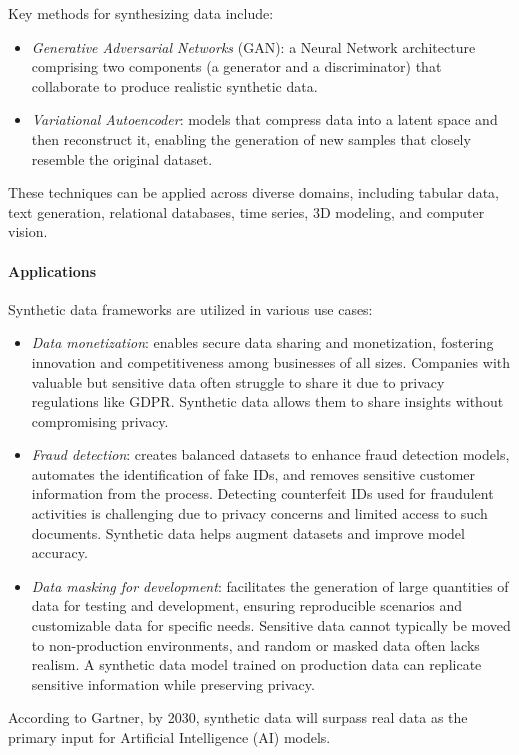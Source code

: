 Key methods for synthesizing data include:
\begin{itemize}
    \item \textit{Generative Adversarial Networks} (GAN): a Neural Network architecture comprising two components (a generator and a discriminator) that collaborate to produce realistic synthetic data.
    \item \textit{Variational Autoencoder}: models that compress data into a latent space and then reconstruct it, enabling the generation of new samples that closely resemble the original dataset.
\end{itemize}
\noindent These techniques can be applied across diverse domains, including tabular data, text generation, relational databases, time series, 3D modeling, and computer vision.

\paragraph*{Applications}
Synthetic data frameworks are utilized in various use cases:
\begin{itemize}
    \item \textit{Data monetization}: enables secure data sharing and monetization, fostering innovation and competitiveness among businesses of all sizes.
        Companies with valuable but sensitive data often struggle to share it due to privacy regulations like GDPR. 
        Synthetic data allows them to share insights without compromising privacy.
    \item \textit{Fraud detection}: creates balanced datasets to enhance fraud detection models, automates the identification of fake IDs, and removes sensitive customer information from the process.
        Detecting counterfeit IDs used for fraudulent activities is challenging due to privacy concerns and limited access to such documents. 
        Synthetic data helps augment datasets and improve model accuracy.
    \item \textit{Data masking for development}: facilitates the generation of large quantities of data for testing and development, ensuring reproducible scenarios and customizable data for specific needs.
        Sensitive data cannot typically be moved to non-production environments, and random or masked data often lacks realism.
        A synthetic data model trained on production data can replicate sensitive information while preserving privacy.
\end{itemize}
\noindent According to Gartner, by 2030, synthetic data will surpass real data as the primary input for Artificial Intelligence (AI) models.

